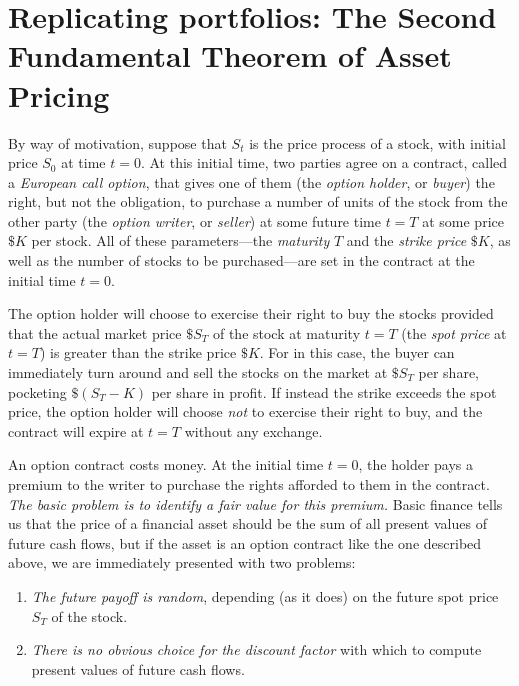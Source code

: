 \documentclass[11pt, openany, oneside]{book}
\theoremstyle{definition}
\theoremstyle{remark}
\theoremstyle{boldital}
\numberwithin{equation}{section}
\begin{document}
\section[Replicating portfolios: The Second Fundamental Theorem of Asset Pricing]%
        {Replicating portfolios: The Second Fundamental Theorem of Asset Pricing%
         }%
\label{sec:FTAP2}

By way of motivation, suppose that $S_t$ is the price process of a stock, with initial price $S_0$ at time $t=0$. At this initial time, two parties agree on a contract, called a \textit{European call option}, that gives one of them (the \textit{option holder}, or \textit{buyer}) the right, but not the obligation, to purchase a number of units of the stock from the other party (the \textit{option writer}, or \textit{seller}) at some future time $t=T$ at some price $\$K$ per stock. All of these parameters---the \textit{maturity} $T$ and the \textit{strike price} $\$K$, as well as the number of stocks to be purchased---are set in the contract at the initial time $t=0$.

The option holder will choose to exercise their right to buy the stocks provided that the actual market price $\$S_T$ of the stock at maturity $t=T$ (the \textit{spot price} at $t=T$) is greater than the strike price $\$K$. For in this case, the buyer can immediately turn around and sell the stocks on the market at $\$S_T$ per share, pocketing $\$(S_T-K)$ per share in profit. If instead the strike exceeds the spot price, the option holder will choose \textit{not} to exercise their right to buy, and the contract will expire at $t=T$ without any exchange.

An option contract costs money. At the initial time $t=0$, the holder pays a premium to the writer to purchase the rights afforded to them in the contract. \textit{The basic problem is to identify a fair value for this premium.} Basic finance tells us that the price of a financial asset should be the sum of all present values of future cash flows, but if the asset is an option contract like the one described above, we are immediately presented with two problems:
\begin{enumerate}
\item \textit{The future payoff is random}, depending (as it does) on the future spot price $S_T$ of the stock.
\item \textit{There is no obvious choice for the discount factor} with which to compute present values of future cash flows.
\end{enumerate}
\end{document}
